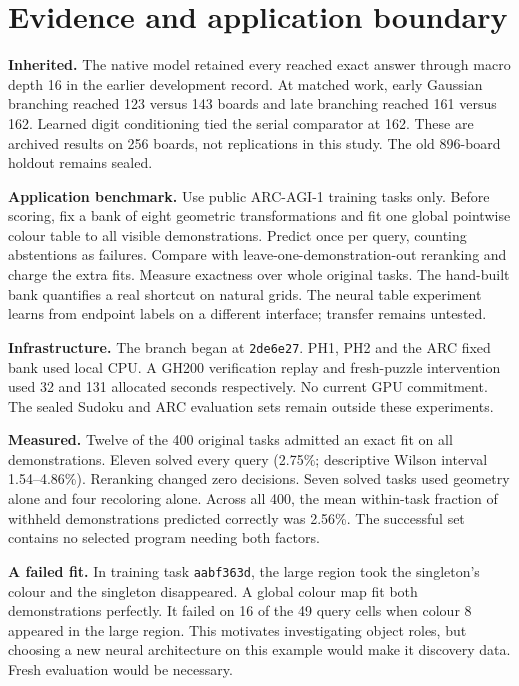 \section*{Evidence and application boundary}
\textbf{Inherited.} The native model retained every reached exact answer through macro depth 16 in the earlier development record. At matched work, early Gaussian branching reached 123 versus 143 boards and late branching reached 161 versus 162. Learned digit conditioning tied the serial comparator at 162. These are archived results on 256 boards, not replications in this study. The old 896-board holdout remains sealed.
\par
\textbf{Application benchmark.} Use public ARC-AGI-1 training tasks only. Before scoring, fix a bank of eight geometric transformations and fit one global pointwise colour table to all visible demonstrations. Predict once per query, counting abstentions as failures. Compare with leave-one-demonstration-out reranking and charge the extra fits. Measure exactness over whole original tasks. The hand-built bank quantifies a real shortcut on natural grids. The neural table experiment learns from endpoint labels on a different interface; transfer remains untested.
\par
\textbf{Infrastructure.} The branch began at \texttt{2de6e27}. PH1, PH2 and the ARC fixed bank used local CPU. A GH200 verification replay and fresh-puzzle intervention used 32 and 131 allocated seconds respectively. No current GPU commitment. The sealed Sudoku and ARC evaluation sets remain outside these experiments.
\par
\textbf{Measured.} Twelve of the 400 original tasks admitted an exact fit on all demonstrations. Eleven solved every query (2.75\%; descriptive Wilson interval 1.54--4.86\%). Reranking changed zero decisions. Seven solved tasks used geometry alone and four recoloring alone. Across all 400, the mean within-task fraction of withheld demonstrations predicted correctly was 2.56\%. The successful set contains no selected program needing both factors.
\par
\textbf{A failed fit.} In training task \texttt{aabf363d}, the large region took the singleton's colour and the singleton disappeared. A global colour map fit both demonstrations perfectly. It failed on 16 of the 49 query cells when colour 8 appeared in the large region. This motivates investigating object roles, but choosing a new neural architecture on this example would make it discovery data. Fresh evaluation would be necessary.
\par

